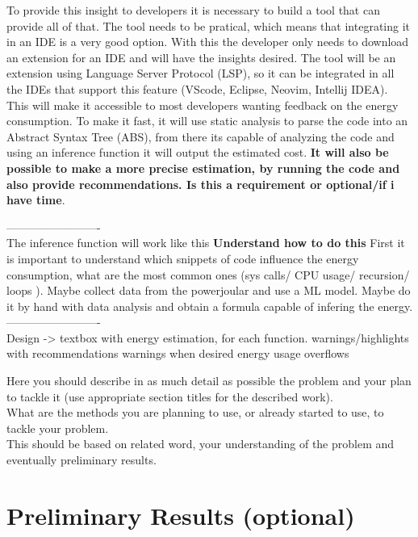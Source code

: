 \documentclass[sigplan]{acmart}
\begin{document}
To provide this insight to developers it is necessary to build a tool that can provide all of that. The tool needs to be pratical, which means that integrating it in an IDE is a very good option. With this the developer only needs to download an extension for an IDE and will have the insights desired.
The tool will be an extension using Language Server Protocol (LSP), so it can be integrated in all the IDEs that support this feature (VScode, Eclipse, Neovim, Intellij IDEA). This will make it accessible to most developers wanting feedback on the energy consumption. To make it fast, it will use static analysis to parse the code into an Abstract Syntax Tree (ABS), from there its capable of analyzing the code and using an inference function it will output the estimated cost. \textbf{It will also be possible to make a more precise estimation, by running the code and also provide recommendations. Is this a requirement or optional/if i have time}.

-------------------------\\
The inference function will work like this \textbf{Understand how to do this}
First it is important to understand which snippets of code influence the energy consumption, what are the most common ones (sys calls/ CPU usage/ recursion/ loops ).
Maybe collect data from the powerjoular and use a ML model.
Maybe do it by hand with data analysis and obtain a formula capable of infering the energy.
-------------------------\\


Design -> textbox with energy estimation, for each function. 
          warnings/highlights with recommendations
          warnings when desired energy usage overflows 


Here you should describe in as much detail as possible the problem and your plan to tackle it (use appropriate section titles for the described work). \\

What are the methods you are planning to use, or already started to use, to tackle your problem. \\

This should be based on related word, your understanding of the problem and eventually preliminary results.

\section{Preliminary Results (optional)} \label{sec:preliminaryresults}
\end{document}
